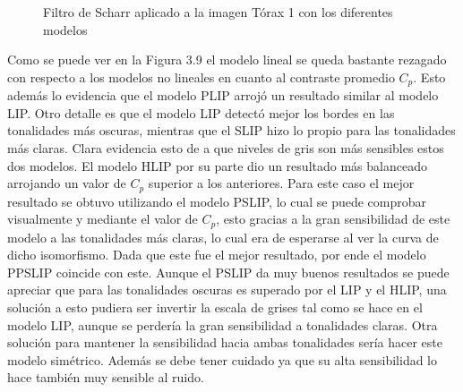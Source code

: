 \begin{figure}
\begin{center}
		\caption{Filtro de Scharr aplicado a la imagen T\'orax 1 con los diferentes modelos}
	\end{center}
\end{figure} 

Como se puede ver en la Figura 3.9 el modelo lineal se queda bastante rezagado con respecto a los modelos no lineales en cuanto al contraste promedio $C_p$. Esto adem\'as lo evidencia que el modelo PLIP arroj\'o un resultado similar al modelo LIP. Otro detalle es que el modelo LIP detect\'o mejor los bordes en las tonalidades m\'as oscuras, mientras que el SLIP hizo lo propio para las tonalidades m\'as claras. Clara evidencia esto de a que niveles de gris son m\'as sensibles estos dos modelos. El modelo HLIP por su parte dio un resultado m\'as balanceado arrojando un valor de $C_p$ superior a los anteriores. Para este caso el mejor resultado se obtuvo utilizando el modelo PSLIP, lo cual se puede comprobar visualmente y mediante el valor de $C_p$, esto gracias a la gran sensibilidad de este modelo a las tonalidades m\'as claras, lo cual era de esperarse al ver la curva de dicho isomorfismo. Dada que este fue el mejor resultado, por ende el modelo PPSLIP coincide con este. Aunque el PSLIP da muy buenos resultados se puede apreciar que para las tonalidades oscuras es superado por el LIP y el HLIP, una soluci\'on a esto pudiera ser invertir la escala de grises tal como se hace en el modelo LIP, aunque se perder\'ia la gran sensibilidad a tonalidades claras. Otra soluci\'on para mantener la sensibilidad hacia ambas tonalidades ser\'ia hacer este modelo sim\'etrico. Adem\'as se debe tener cuidado ya que su alta sensibilidad lo hace tambi\'en muy sensible al ruido.

